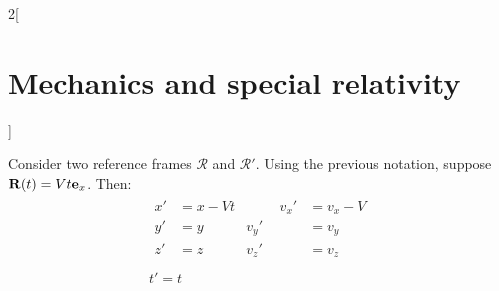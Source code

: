 \documentclass[../../../main.tex]{subfiles}
\begin{document}
\begin{multicols}{2}[\section{Mechanics and special relativity}]
\begin{prop}
  \end{prop}
  \begin{prop}
    Consider two reference frames $\mathcal{R}$ and $\mathcal{R}'$. Using the previous notation, suppose $\boldsymbol{\mathrm{R}}(t)=Vt\boldsymbol{\mathrm{e}}_x$. Then:
    \begin{gather*}
      \begin{aligned}
        x' & =x-Vt & \hspace{1cm} v_x' & =v_x-V \\
        y' & =y    & v_y'              & =v_y   \\
        z' & =z    & v_z'              & =v_z   \\
      \end{aligned}\\
      t'=t
    \end{gather*}
  \end{prop}

\end{multicols}
\end{document}
